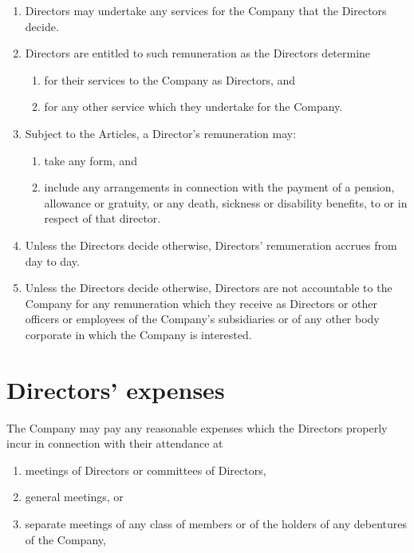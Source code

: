 \documentclass[a4paper,12pt]{article}
\renewcommand{\labelenumi}{\thesection.\arabic{enumi}}
\renewcommand{\labelenumii}{(\alph{enumii})}
\begin{document}
\begin{enumerate}
  \item Directors may undertake any services for the Company that the Directors decide.
  \item Directors are entitled to such remuneration as the Directors determine
  \begin{enumerate}
    \renewcommand{\labelenumii}{(\alph{enumii})}
    \item for their services to the Company as Directors, and
    \item for any other service which they undertake for the Company.
  \end{enumerate}
  \item	Subject to the Articles, a Director’s remuneration may:
  \begin{enumerate}
    \item take any form, and
    \item include any arrangements in connection with the payment of a pension, allowance or gratuity, or any death, sickness or disability benefits, to or in respect of that director.
  \end{enumerate}
  \item Unless the Directors decide otherwise, Directors’ remuneration accrues from day to day.
  \item	Unless the Directors decide otherwise, Directors are not accountable to the Company for any remuneration which they receive as Directors or other officers or employees of the Company’s subsidiaries or of any other body corporate in which the Company is interested.
\end{enumerate}

\section{Directors’ expenses}

The Company may pay any reasonable expenses which the Directors properly incur in connection with their attendance at

\begin{enumerate}
  \renewcommand{\labelenumi}{(\alph{enumi})}
  \item meetings of Directors or committees of Directors,
  \item general meetings, or
  \item separate meetings of any class of members or of the holders of any debentures of the Company,
\end{enumerate}
\end{document}
